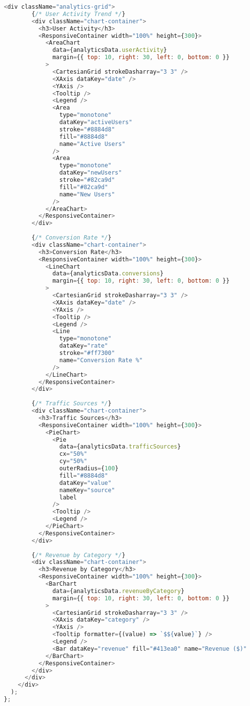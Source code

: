 \documentclass[12pt,a4paper]{article}
\begin{document}
\begin{lstlisting}[language=JavaScript]
      <div className="analytics-grid">
        {/* User Activity Trend */}
        <div className="chart-container">
          <h3>User Activity</h3>
          <ResponsiveContainer width="100%" height={300}>
            <AreaChart
              data={analyticsData.userActivity}
              margin={{ top: 10, right: 30, left: 0, bottom: 0 }}
            >
              <CartesianGrid strokeDasharray="3 3" />
              <XAxis dataKey="date" />
              <YAxis />
              <Tooltip />
              <Legend />
              <Area
                type="monotone"
                dataKey="activeUsers"
                stroke="#8884d8"
                fill="#8884d8"
                name="Active Users"
              />
              <Area
                type="monotone"
                dataKey="newUsers"
                stroke="#82ca9d"
                fill="#82ca9d"
                name="New Users"
              />
            </AreaChart>
          </ResponsiveContainer>
        </div>
        
        {/* Conversion Rate */}
        <div className="chart-container">
          <h3>Conversion Rate</h3>
          <ResponsiveContainer width="100%" height={300}>
            <LineChart
              data={analyticsData.conversions}
              margin={{ top: 10, right: 30, left: 0, bottom: 0 }}
            >
              <CartesianGrid strokeDasharray="3 3" />
              <XAxis dataKey="date" />
              <YAxis />
              <Tooltip />
              <Legend />
              <Line
                type="monotone"
                dataKey="rate"
                stroke="#ff7300"
                name="Conversion Rate %"
              />
            </LineChart>
          </ResponsiveContainer>
        </div>
        
        {/* Traffic Sources */}
        <div className="chart-container">
          <h3>Traffic Sources</h3>
          <ResponsiveContainer width="100%" height={300}>
            <PieChart>
              <Pie
                data={analyticsData.trafficSources}
                cx="50%"
                cy="50%"
                outerRadius={100}
                fill="#8884d8"
                dataKey="value"
                nameKey="source"
                label
              />
              <Tooltip />
              <Legend />
            </PieChart>
          </ResponsiveContainer>
        </div>
        
        {/* Revenue by Category */}
        <div className="chart-container">
          <h3>Revenue by Category</h3>
          <ResponsiveContainer width="100%" height={300}>
            <BarChart
              data={analyticsData.revenueByCategory}
              margin={{ top: 10, right: 30, left: 0, bottom: 0 }}
            >
              <CartesianGrid strokeDasharray="3 3" />
              <XAxis dataKey="category" />
              <YAxis />
              <Tooltip formatter={(value) => `$${value}`} />
              <Legend />
              <Bar dataKey="revenue" fill="#413ea0" name="Revenue ($)" />
            </BarChart>
          </ResponsiveContainer>
        </div>
      </div>
    </div>
  );
};


\end{lstlisting}
\end{document}
